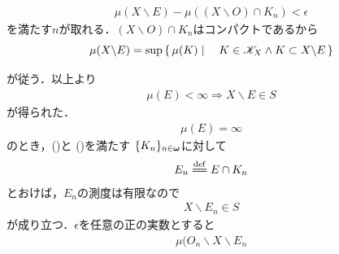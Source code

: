 \begin{sketch}
\begin{description}
					\begin{align}
						\mu(X \backslash E) - \mu((X \backslash O) \cap K_n) < \epsilon
					\end{align}
					を満たす$n$が取れる．$(X \backslash O) \cap K_n$はコンパクトであるから
					\begin{align}
						\mu(X \backslash E) = \operatorname*{sup}_{} \left\{\, \mu(K) \mid \quad K \in \mathscr{K}_X \wedge K \subset X \backslash E\, \right\}
					\end{align}
					が従う．以上より
					\begin{align}
						\mu(E) < \infty \Longrightarrow X \backslash E \in S
					\end{align}
					が得られた．
					\begin{align}
						\mu(E) = \infty
					\end{align}
					のとき，()と
					()を満たす
					$\{K_n\}_{n \in {\boldsymbol \omega}}$に対して
					\begin{align}
						E_n \defeq E \cap K_n
					\end{align}
					とおけば，$E_n$の測度は有限なので
					\begin{align}
						X \backslash E_n \in S
					\end{align}
					が成り立つ．$\epsilon$を任意の正の実数とすると
					\begin{align}
						\mu(O_n \backslash X \backslash E_n
					\end{align}
			\end{description}
		\end{sketch}
		
		\begin{screen}
			\begin{thm}[正則正値測度空間のLebesgue拡大も正則正値測度空間]
				
			\end{thm}
		\end{screen}
		